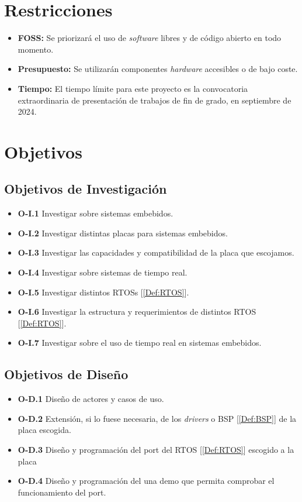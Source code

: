 \section{Restricciones}
\begin{itemize}
    \item \textbf{FOSS:} Se priorizará el uso de \emph{software} libres y de código abierto en todo momento.
    \item \textbf{Presupuesto:} Se utilizarán componentes \emph{hardware} accesibles o de bajo coste.
    \item \textbf{Tiempo:} El tiempo límite para este proyecto es la convocatoria extraordinaria de presentación de trabajos de fin de grado, en septiembre de 2024.
\end{itemize}

\section{Objetivos}
\subsection{Objetivos de Investigación}
\begin{itemize}
    \item \textbf{O-I.1} Investigar sobre sistemas embebidos.
    \item \textbf{O-I.2} Investigar distintas placas para sistemas embebidos.
    \item \textbf{O-I.3} Investigar las capacidades y compatibilidad de la placa que escojamos.
    \item \textbf{O-I.4} Investigar sobre sistemas de tiempo real.
    \item \textbf{O-I.5} Investigar distintos RTOSs [\ref{Def:RTOS}].
    \item \textbf{O-I.6} Investigar la estructura  y requerimientos de distintos RTOS [\ref{Def:RTOS}].
    \item \textbf{O-I.7} Investigar sobre el uso de tiempo real en sistemas embebidos.
\end{itemize}


\subsection{Objetivos de Diseño}
\begin{itemize}
    \item \textbf{O-D.1} Diseño de actores y casos de uso. %
    \item \textbf{O-D.2} Extensión, si lo fuese necesaria, de los \emph{drivers} o BSP [\ref{Def:BSP}] de la placa escogida.
    \item \textbf{O-D.3} Diseño y programación del port del RTOS [\ref{Def:RTOS}] escogido a la placa
    \item \textbf{O-D.4} Diseño y programación del una demo que permita comprobar el funcionamiento del port.
\end{itemize}
